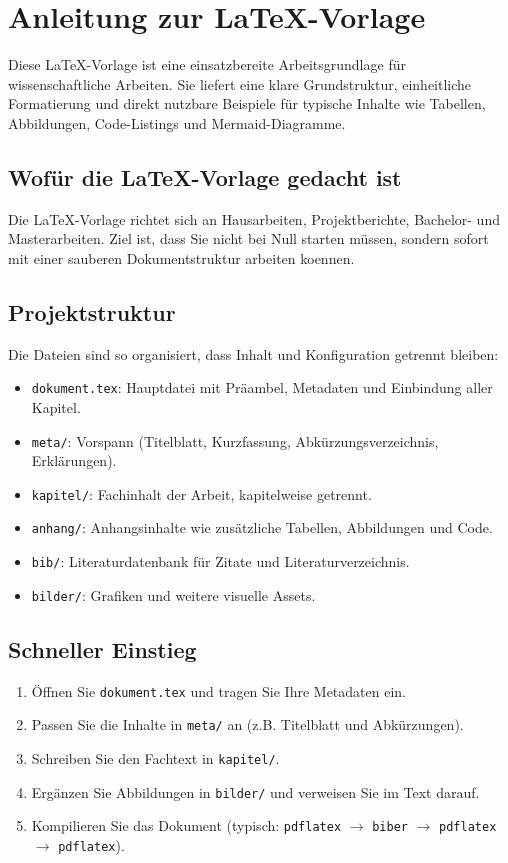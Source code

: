 \chapter{Anleitung zur LaTeX-Vorlage}

Diese LaTeX-Vorlage ist eine einsatzbereite Arbeitsgrundlage für wissenschaftliche Arbeiten. Sie liefert eine klare Grundstruktur, einheitliche Formatierung und direkt nutzbare Beispiele für typische Inhalte wie Tabellen, Abbildungen, Code-Listings und Mermaid-Diagramme.

\section{Wofür die LaTeX-Vorlage gedacht ist}
Die LaTeX-Vorlage richtet sich an Hausarbeiten, Projektberichte, Bachelor- und Masterarbeiten. Ziel ist, dass Sie nicht bei Null starten müssen, sondern sofort mit einer sauberen Dokumentstruktur arbeiten koennen.

\section{Projektstruktur}
Die Dateien sind so organisiert, dass Inhalt und Konfiguration getrennt bleiben:

\begin{itemize}
    \item \texttt{dokument.tex}: Hauptdatei mit Präambel, Metadaten und Einbindung aller Kapitel.
    \item \texttt{meta/}: Vorspann (Titelblatt, Kurzfassung, Abkürzungsverzeichnis, Erklärungen).
    \item \texttt{kapitel/}: Fachinhalt der Arbeit, kapitelweise getrennt.
    \item \texttt{anhang/}: Anhangsinhalte wie zusätzliche Tabellen, Abbildungen und Code.
    \item \texttt{bib/}: Literaturdatenbank für Zitate und Literaturverzeichnis.
    \item \texttt{bilder/}: Grafiken und weitere visuelle Assets.
\end{itemize}

\section{Schneller Einstieg}
\begin{enumerate}
    \item Öffnen Sie \texttt{dokument.tex} und tragen Sie Ihre Metadaten ein.
    \item Passen Sie die Inhalte in \texttt{meta/} an (z.B. Titelblatt und Abkürzungen).
    \item Schreiben Sie den Fachtext in \texttt{kapitel/}.
    \item Ergänzen Sie Abbildungen in \texttt{bilder/} und verweisen Sie im Text darauf.
    \item Kompilieren Sie das Dokument (typisch: \texttt{pdflatex} $\rightarrow$ \texttt{biber} $\rightarrow$ \texttt{pdflatex} $\rightarrow$ \texttt{pdflatex}).
\end{enumerate}


